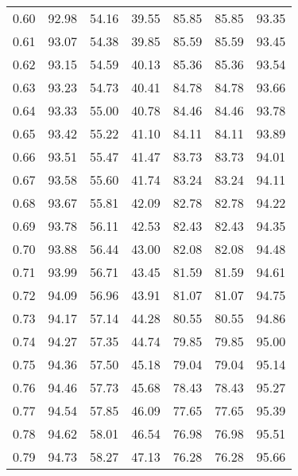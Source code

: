 \begin{tabular}{|c|c|c|c|c|c|c|}
      0.60 &     92.98 &     54.16 &      39.55 &   85.85 &      85.85 &         93.35 \\
      0.61 &     93.07 &     54.38 &      39.85 &   85.59 &      85.59 &         93.45 \\
      0.62 &     93.15 &     54.59 &      40.13 &   85.36 &      85.36 &         93.54 \\
      0.63 &     93.23 &     54.73 &      40.41 &   84.78 &      84.78 &         93.66 \\
      0.64 &     93.33 &     55.00 &      40.78 &   84.46 &      84.46 &         93.78 \\
      0.65 &     93.42 &     55.22 &      41.10 &   84.11 &      84.11 &         93.89 \\
      0.66 &     93.51 &     55.47 &      41.47 &   83.73 &      83.73 &         94.01 \\
      0.67 &     93.58 &     55.60 &      41.74 &   83.24 &      83.24 &         94.11 \\
      0.68 &     93.67 &     55.81 &      42.09 &   82.78 &      82.78 &         94.22 \\
      0.69 &     93.78 &     56.11 &      42.53 &   82.43 &      82.43 &         94.35 \\
      0.70 &     93.88 &     56.44 &      43.00 &   82.08 &      82.08 &         94.48 \\
      0.71 &     93.99 &     56.71 &      43.45 &   81.59 &      81.59 &         94.61 \\
      0.72 &     94.09 &     56.96 &      43.91 &   81.07 &      81.07 &         94.75 \\
      0.73 &     94.17 &     57.14 &      44.28 &   80.55 &      80.55 &         94.86 \\
      0.74 &     94.27 &     57.35 &      44.74 &   79.85 &      79.85 &         95.00 \\
      0.75 &     94.36 &     57.50 &      45.18 &   79.04 &      79.04 &         95.14 \\
      0.76 &     94.46 &     57.73 &      45.68 &   78.43 &      78.43 &         95.27 \\
      0.77 &     94.54 &     57.85 &      46.09 &   77.65 &      77.65 &         95.39 \\
      0.78 &     94.62 &     58.01 &      46.54 &   76.98 &      76.98 &         95.51 \\
      0.79 &     94.73 &     58.27 &      47.13 &   76.28 &      76.28 &         95.66 \\

\end{tabular}
